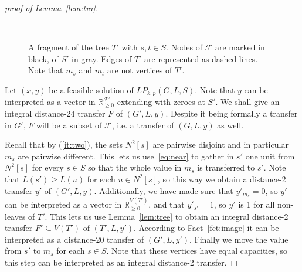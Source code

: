 \documentclass{article}
\newcommand{\F}{\mathcal{F}}
\newcommand{\preal}{\mathbb{R}_{\ge 0}}
\newcommand{\sub}{\subseteq}
\theoremstyle{plain}
\theoremstyle{definition}
\begin{document}
\begin{proof}[proof of Lemma~\ref{lem:tra}]
\begin{figure}
\begin{center}
\end{center}
\caption{\label{fig:tree}
A fragment of the tree $T'$ with $s,t\in S$. Nodes of $\F$ are
marked in black, of $S'$ in gray. Edges of $T'$ are represented as dashed lines.
Note that $m_s$ and $m_t$ are not vertices of $T'$.}\
\end{figure}
 Let $(x,y)$ be a feasible solution of $LP_{k,p}(G,L,S)$. Note that $y$
can be interpreted as a vector in $\preal^{\F'}$ extending with zeroes at $S'$.
We shall give an integral distance-24 transfer $F$ of $(G',L,y)$.
Despite it being formally a transfer in $G'$, $F$ will be a subset of $\F$, i.e. a
transfer of $(G,L,y)$  as well.

Recall that by (\ref{it:two}), the sets
$N^2[s]$ are pairwise disjoint and in particular $m_s$ are pairwise different. 
This lets us use~\eqref{eq:near} to gather in $s'$ one unit from $N^2[s]$ for
every $s\in S$ so that the whole value in $m_s$
is transferred to $s'$.
Note that $L(s')\ge L(u)$ for each $u\in N^2[s]$, so
this way we obtain a distance-2 transfer $y'$ of $(G',L,y)$. Additionally, we
have made sure that $y'_{m_s}=0$, so $y'$ can be interpreted as a vector in
$\preal^{V(T')}$, and that $y'_{s'}=1$, so $y'$ is 1 for all non-leaves of
$T'$. This lets us use Lemma~\ref{lem:tree} to obtain an integral distance-2 transfer $F'\sub V(T')$ of $(T',L,y')$. According to
Fact~\ref{fct:image} it can be interpreted as a distance-20 transfer of
$(G',L,y')$. Finally we move the value from $s'$ to $m_s$ for each $s\in S$.
Note that these vertices have equal capacities, so this step can be interpreted
as an integral distance-2 transfer.


\end{proof}
\end{document}
